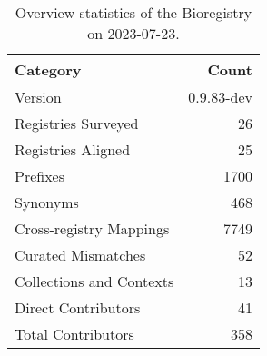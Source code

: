 \begin{table}
\caption{Overview statistics of the Bioregistry on 2023-07-23.}
\label{tab:bioregistry-summary}
\begin{tabular}{lr}
\toprule
Category & Count \\
\midrule
Version & 0.9.83-dev \\
Registries Surveyed & 26 \\
Registries Aligned & 25 \\
Prefixes & 1700 \\
Synonyms & 468 \\
Cross-registry Mappings & 7749 \\
Curated Mismatches & 52 \\
Collections and Contexts & 13 \\
Direct Contributors & 41 \\
Total Contributors & 358 \\
\bottomrule
\end{tabular}
\end{table}
